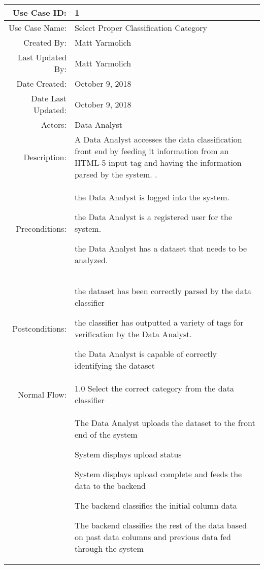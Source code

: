 \documentclass[12pt,oneside,letterpaper]{article}
\newenvironment{packed_enumerate}{ %
\vspace{-7mm}
\begin{enumerate}
  \setlength{\itemsep}{0pt}
  \setlength{\parskip}{0pt}
  \setlength{\parsep}{0pt}
}{\end{enumerate}
\vspace{-8mm}}
\begin{document}
\begin{longtable}{|r|p{3.8in}|}
\hline
Use Case ID:&1\\
\hline
Use Case Name:&Select Proper Classification Category\\
\hline
Created By:&Matt Yarmolich\\
\hline
Last Updated By:&Matt Yarmolich\\
\hline
Date Created:&October 9, 2018\\
\hline
Date Last Updated:&October 9, 2018\\
\hline
Actors:&Data Analyst\\
\hline
Description:&A Data Analyst accesses the data classification front end by feeding it information from an HTML-5 input tag and having the information parsed by the system. .\\
\hline
Preconditions:&
\begin{packed_enumerate}
\item the Data Analyst is logged into the system.
\item the Data Analyst is a registered user for the system.
\item the Data Analyst has a dataset that needs to be analyzed.
\end{packed_enumerate}\\
\hline
Postconditions:&
\begin{packed_enumerate}
\item the dataset has been correctly parsed by the data classifier
\item the classifier has outputted a variety of tags for verification by the Data Analyst. 
\item the Data Analyst is capable of correctly identifying the dataset
\end{packed_enumerate}\\
\hline
Normal Flow:&1.0 Select the correct category from the data classifier\\
&  %
\begin{packed_enumerate}
\item The Data Analyst uploads the dataset to the front end of the system
\item System displays upload status
\item System displays upload complete and feeds the data to the backend
\item The backend classifies the initial column data
\item The backend classifies the rest of the data based on past data columns and previous data fed through the system

\end{packed_enumerate}
\end{longtable}
\end{document}
